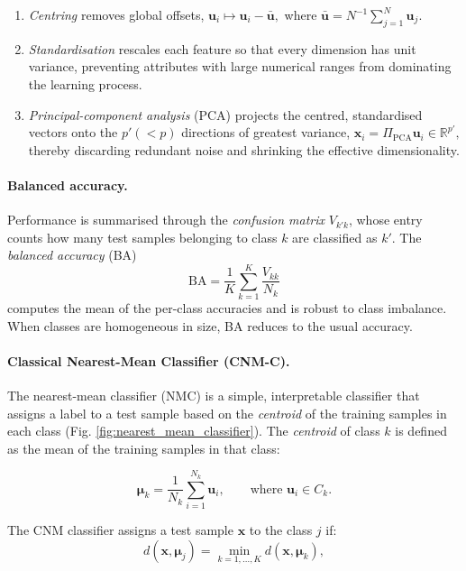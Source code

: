 \documentclass[twocolumn]{article} %
\begin{document}
\begin{enumerate}[leftmargin=*,label=(\alph*)]
\item \textit{Centring} removes global offsets,
      \(
      \mathbf u_i\!\longmapsto\!
      \mathbf u_i-\bar{\mathbf u},
      \)
      where
      $\bar{\mathbf u}=N^{-1}\sum_{j=1}^{N}\mathbf u_j$.
\item \textit{Standardisation} rescales each feature so that every
      dimension has unit variance, preventing attributes with large
      numerical ranges from dominating the learning process.
\item \textit{Principal-component analysis} (PCA) projects the centred,
      standardised vectors onto the $p'(<p)$ directions of greatest
      variance,
      \(
      \mathbf x_i=\Pi_{\text{PCA}}\mathbf u_i\in\mathbb R^{p'},
      \)
      thereby discarding redundant noise and shrinking the effective
      dimensionality.
\end{enumerate}


\paragraph{Balanced accuracy.}
Performance is summarised through the
\emph{confusion matrix}
$V_{k'k}$, whose entry counts how many test samples belonging to class
$k$ are classified as $k'$.  The
\emph{balanced accuracy} (BA)
\[
\mathrm{BA}=
\frac{1}{K}\sum_{k=1}^{K}\frac{V_{kk}}{N_k}
\]
computes the mean of the per-class accuracies and is robust to class
imbalance. When classes are homogeneous in size, BA reduces to
the usual accuracy.

\paragraph{Classical Nearest-Mean Classifier (CNM-C).}
The nearest-mean classifier (NMC) is a simple, interpretable
classifier that assigns a label to a test sample based on the
\emph{centroid} of the training samples in each class (Fig. \ref{fig:nearest_mean_classifier}).  The
\emph{centroid} of class \(k\) is defined as the mean of the training
samples in that class:

\[
  \boldsymbol\mu_k
  =\frac{1}{N_k}\sum_{i=1}^{N_k}\mathbf u_i,
  \qquad
  \text{where } \mathbf u_i\in C_k.
\]

The CNM classifier assigns a test sample \(\mathbf x\) to the class $j$ if:
\[
    d(\mathbf x,\boldsymbol\mu_j) = \min_{k=1,\dots,K} d(\mathbf x,\boldsymbol\mu_k),
\]
\end{document}
